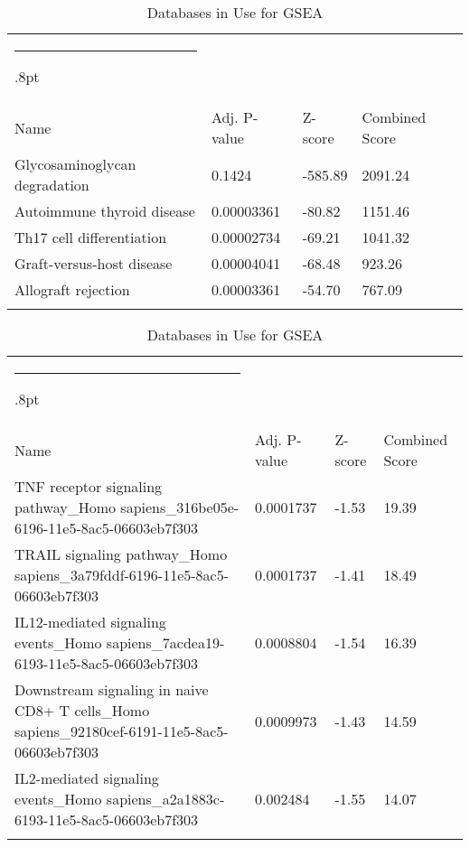 \documentclass[3p,authoryear,preprint,12pt]{elsarticle}
\makeatletter
\def\hlinewd#1{%
  \noalign{\ifnum0=`}\fi\hrule \@height #1%
  \futurelet\reserved@a\@xhline}
\def\tbltoprule{\hlinewd{.8pt}\\[-12pt]}
\def\tblbottomrule{\noalign{\vspace*{6pt}}\hline\noalign{\vspace*{2pt}}}
\def\tblmidrule{\noalign{\vspace*{6pt}}\hline\noalign{\vspace*{2pt}}}
\makeatother
\begin{document}
\begin{table*}[!htbp]
	\caption{{Databases in Use for GSEA} }
	\label{tw-de478ae31cc6}
	\def\arraystretch{1}
	\ignorespaces 
	\centering 
	\begin{tabulary}{\linewidth}{p{\dimexpr.65\tabcolsep}p{\dimexpr.15\tabcolsep}p{\dimexpr.1\tabcolsep}p{\dimexpr.1\tabcolsep}}
		\tbltoprule Name & Adj. P-value & Z-score & Combined Score\\
		\tblmidrule
Glycosaminoglycan degradation & 0.1424 & -585.89 & 2091.24 \\
Autoimmune thyroid disease & 0.00003361 & -80.82 & 1151.46 \\
Th17 cell differentiation & 0.00002734 & -69.21 & 1041.32 \\
Graft-versus-host disease & 0.00004041 & -68.48 & 923.26 \\
Allograft rejection & 0.00003361 & -54.70 & 767.09 \\
		\tblbottomrule
	\end{tabulary}\par 
\end{table*}
\begin{table*}[!htbp]
	\caption{{Databases in Use for GSEA} }
	\label{tw-de478ae31cc6}
	\def\arraystretch{1}
	\ignorespaces 
	\centering 
	\begin{tabulary}{\linewidth}{p{\dimexpr.65\tabcolsep}p{\dimexpr.15\tabcolsep}p{\dimexpr.1\tabcolsep}p{\dimexpr.1\tabcolsep}}
		\tbltoprule Name & Adj. P-value & Z-score & Combined Score\\
		\tblmidrule
TNF receptor signaling pathway\_Homo sapiens\_316be05e-6196-11e5-8ac5-06603eb7f303 & 0.0001737 & -1.53 & 19.39 \\
TRAIL signaling pathway\_Homo sapiens\_3a79fddf-6196-11e5-8ac5-06603eb7f303 & 0.0001737 & -1.41 & 18.49 \\
IL12-mediated signaling events\_Homo sapiens\_7acdea19-6193-11e5-8ac5-06603eb7f303 & 0.0008804 & -1.54 & 16.39 \\
Downstream signaling in naive CD8+ T cells\_Homo sapiens\_92180cef-6191-11e5-8ac5-06603eb7f303 & 0.0009973 & -1.43 & 14.59 \\
IL2-mediated signaling events\_Homo sapiens\_a2a1883c-6193-11e5-8ac5-06603eb7f303 & 0.002484 & -1.55 & 14.07 \\
		\tblbottomrule
	\end{tabulary}\par 
\end{table*}
\end{document}
